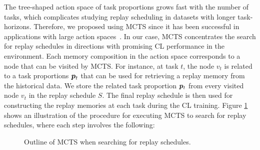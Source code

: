 The tree-shaped action space of task proportions grows fast with the number of tasks, which complicates studying replay scheduling in datasets with longer task-horizons. 
Therefore, we proposed using MCTS since it has been successful in applications with large action spaces~\cite{browne2012survey, chaudhry2018feature, silver2016mastering}. In our case, MCTS concentrates the search for replay schedules in directions with promising CL performance in the environment. 
Each memory composition in the action space corresponds to a node that can be visited by MCTS. For instance, at task $t$, the node $v_t$ is related to a task proportions ${\bm{p}}_{t}$ that can be used for retrieving a replay memory from the historical data. 
We store the related task proportion ${\bm{p}}_t$ from every visited node $v_t$ in the replay schedule $S$. The final replay schedule is then used for constructing the replay memories at each task during the CL training. 
Figure \ref{fig:mcts_outline} shows an illustration of the procedure for executing MCTS to search for replay schedules, where each step involves the following:

\begin{figure}[t]
	\centering
	
	\caption{Outline of MCTS when searching for replay schedules. }
	\label{fig:mcts_outline}
	\vspace{-2mm}
\end{figure}

